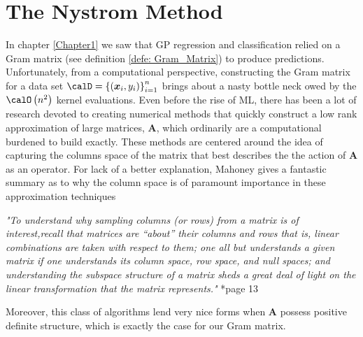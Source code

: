 \section{The Nystrom Method}\label{Chapter2}
In chapter \ref{Chapter1} we saw that GP regression and classification relied on a Gram matrix (see definition \ref{defe: Gram_Matrix}) to produce predictions. Unfortunately, from a computational perspective, constructing the Gram matrix for a data set $\calD = \left\{ \left( \bm{x}_i , y_{i} \right) \right\}_{i=1}^{n}$ brings about a nasty bottle neck owed by the $\calO \left( n^2 \right)$ kernel evaluations. Even before the rise of ML, there has been a lot of research devoted to creating numerical methods that quickly construct a low rank approximation of large matrices, $\bm{A}$, which ordinarily are a computational burdened to build exactly. These methods are centered around the idea of capturing the columns space of the matrix that best describes the the action of $\bm{A}$ as an operator. For lack of a better explanation, Mahoney gives a fantastic summary as to why the column space is of paramount importance in these approximation techniques
\begin{center}
    \emph{"To understand why sampling columns (or rows) from a matrix is of interest,recall that matrices are “about” their columns and rows that is, linear combinations are taken with respect to them; one all but understands a given matrix if one understands its column space, row space, and null
        spaces; and understanding the subspace structure of a matrix sheds a great deal of light on the linear transformation that the matrix represents."} \cite{DBLP:journals/corr/abs-1104-5557}*{page 13}
\end{center}
Moreover, this class of algorithms lend very nice forms when $\bm{A}$ possess positive definite structure, which is exactly the case for our Gram matrix.





